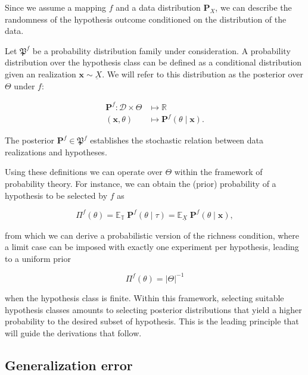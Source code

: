 Since we assume a mapping $f$ and a data distribution $\mathbf{P}_{X}$, we can describe
the randomness of the hypothesis outcome conditioned on the distribution of the data.

\begin{definition}[Posterior]\label{def:posterior}
    Let $\mathfrak{P}^f$ be a probability distribution family under consideration.
    A probability distribution over the hypothesis class can be defined as a 
    conditional distribution given an realization $\bm{x} \sim \underbar{X}$. 
    We will refer to this distribution as the posterior over $\Theta$ under $f$:

    $$
        \begin{aligned}
            \mathbf{P}^f: \mathcal{D} \times \Theta & \longmapsto \mathbb{R} \\
            (\bm{x}, \theta) & \longmapsto \mathbf{P}^f (\theta \mid \bm{x}).
        \end{aligned}
    $$

    The posterior $\mathbf{P}^f \in \mathfrak{P}^f$ establishes the stochastic relation between data realizations and hypotheses.
    
\end{definition}

Using these definitions we can operate over $\Theta$ within the framework of probability 
theory. For instance, we can obtain the (prior) probability of a hypothesis to be
selected by $f$ as

$$
 \Pi^f (\theta) = \mathbb{E}_{\mathbb{T}} \; \mathbf{P}^f (\theta \mid \tau) = \mathbb{E}_{\underline{X}} \; \mathbf{P}^f (\theta \mid \bm{x}),
$$

from which we can derive a probabilistic version of the richness condition, where a limit
case can be imposed with exactly one experiment per hypothesis, leading to a uniform prior

$$
\Pi^f (\theta) = |\Theta|^{-1}
$$

when the hypothesis class is finite. Within this framework, selecting suitable hypothesis classes amounts to selecting
posterior distributions that yield a higher probability to the desired subset of hypothesis. This
is the leading principle that will guide the derivations that follow.

\subsection{Generalization error}

